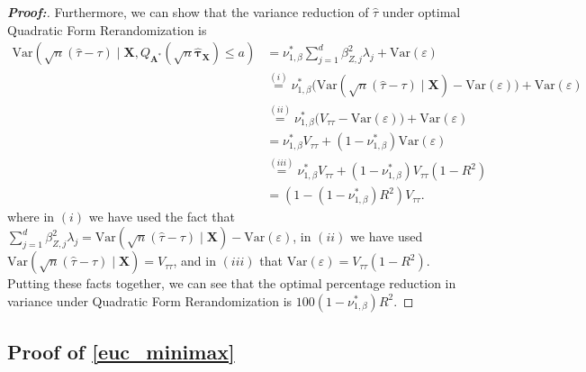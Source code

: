 \documentclass[11pt,twoside]{article}
\theoremstyle{definition}
\theoremstyle{remark}
\begin{document}
\begin{proof}[\textbf{Proof:}]
Furthermore, we can show that the variance reduction of $\widehat{\tau}$ under optimal Quadratic Form Rerandomization is
\begin{align*}
     \text{Var}\left(  \sqrt{n} \left(\widehat{\tau} - \tau \right) \mid \mathbf{X}, Q_{\mathbf{A}^*}(\sqrt{n} \widehat{\bm{\tau}}_{\mathbf{X}}) \leq a \right) &= \nu^*_{1, \beta} \sum^d_{j=1} \beta^2_{Z,j} \lambda_j +  \text{Var}(\varepsilon) \\
     &\overset{(i)}{=} \nu^*_{1, \beta} \Big( \text{Var}(\sqrt{n} \left(\widehat{\tau} - \tau \right) \mid \mathbf{X}) - \text{Var}(\varepsilon) \Big) +  \text{Var}(\varepsilon) \\
     &\overset{(ii)}{=} \nu^*_{1, \beta}\Big(V_{\tau \tau} - \text{Var}(\varepsilon) \Big) + \text{Var}( \varepsilon) \\
    &= \nu^*_{1, \beta} V_{\tau \tau} + (1 - \nu^*_{1, \beta}) \text{Var}( \varepsilon) \\
    &\overset{(iii)}{=} \nu^*_{1, \beta} V_{\tau \tau} + (1 - \nu^*_{1, \beta}) V_{\tau \tau}(1 - R^2) \\
    &=  (1 - (1 - \nu^*_{1, \beta})R^2) V_{\tau \tau}.
\end{align*}
where in $(i)$ we have used the fact that $\sum^d_{j=1} \beta^2_{Z,j} \lambda_j = \text{Var}(\sqrt{n} \left(\widehat{\tau} - \tau \right) \mid \mathbf{X}) - \text{Var}(\varepsilon)$, in $(ii)$ we have used
$\text{Var}(\sqrt{n} \left(\widehat{\tau} - \tau \right) \mid \mathbf{X}) = V_{\tau \tau}$, and in $(iii)$ that $\text{Var}(\varepsilon) = V_{\tau \tau}(1 - R^2)$. Putting these facts together, we can see that the optimal percentage reduction in variance under Quadratic Form Rerandomization is $100(1 - \nu^*_{1, \beta})R^2$.
\end{proof}


\subsection{Proof of \texorpdfstring{\cref{euc_minimax}}{Theorem 6}} \label{euc_minimax_proof}
\end{document}
